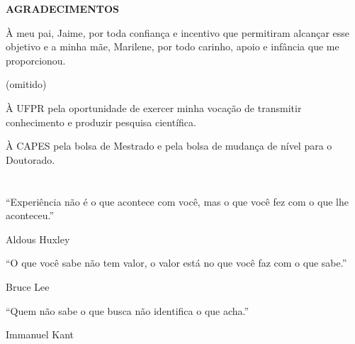 \newpage\null\thispagestyle{empty}\newpage


\newpage
\begin{center}
\textbf{AGRADECIMENTOS}
\end{center}
\vspace{0.5cm}

À meu pai, Jaime, por toda confiança e incentivo que permitiram 
alcançar esse objetivo e a minha mãe, Marilene, por todo carinho, 
apoio e infância que me proporcionou.

(omitido)

À UFPR pela oportunidade de exercer minha vocação de transmitir 
conhecimento e produzir pesquisa científica.

À CAPES pela bolsa de Mestrado e pela bolsa de mudança de nível para 
o Doutorado.


\newpage
\section*{}
\vspace{8cm}

\setlength{\epigraphrule}{0pt}
\epigraph{
``Experiência não é o que acontece com você, mas o que você fez com o que lhe 
aconteceu.''}{Aldous Huxley}

\setlength{\epigraphrule}{0pt}
\epigraph{
``O que você sabe não tem valor, o valor está no que você faz com o
que sabe.''}{Bruce Lee}
 
\setlength{\epigraphrule}{0pt}
\epigraph{
``Quem não sabe o que busca não identifica o que acha.''}{Immanuel Kant}

\newpage\null\thispagestyle{empty}\newpage

